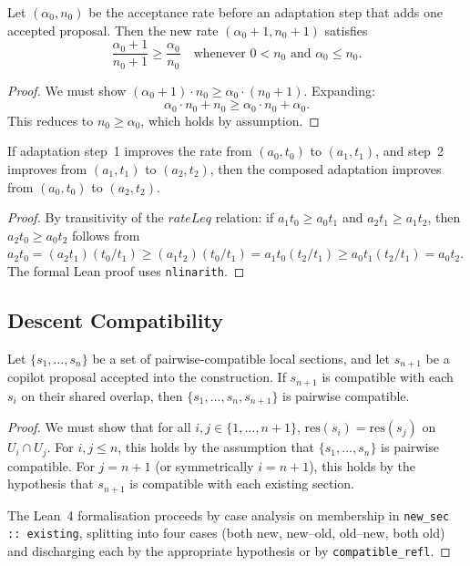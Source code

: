 \documentclass[11pt]{article}
\newcommand{\accrate}{\alpha}
\newcommand{\restrict}{\mathrm{res}}
\begin{document}
\begin{theorem}\label{thm:adapt-mono}
Let $(\accrate_0, n_0)$ be the acceptance rate before an adaptation
step that adds one accepted proposal.  Then the new rate
$(\accrate_0 + 1, n_0 + 1)$ satisfies
\[
  \frac{\accrate_0 + 1}{n_0 + 1} \geq \frac{\accrate_0}{n_0}
  \quad\text{whenever } 0 < n_0 \text{ and } \accrate_0 \leq n_0.
\]
\end{theorem}

\begin{proof}
We must show $(\accrate_0 + 1) \cdot n_0 \geq \accrate_0 \cdot
(n_0 + 1)$.  Expanding:
\[
  \accrate_0 \cdot n_0 + n_0
  \geq \accrate_0 \cdot n_0 + \accrate_0.
\]
This reduces to $n_0 \geq \accrate_0$, which holds by assumption.
\end{proof}

\begin{lemma}\label{lem:adapt-compose}
If adaptation step~1 improves the rate from $(a_0, t_0)$ to
$(a_1, t_1)$, and step~2 improves from $(a_1, t_1)$ to
$(a_2, t_2)$, then the composed adaptation improves from
$(a_0, t_0)$ to $(a_2, t_2)$.
\end{lemma}

\begin{proof}
By transitivity of the $\mathit{rateLeq}$ relation: if
$a_1 t_0 \geq a_0 t_1$ and $a_2 t_1 \geq a_1 t_2$, then
$a_2 t_0 \geq a_0 t_2$ follows from $a_2 t_0 = (a_2 t_1)(t_0/t_1)
\geq (a_1 t_2)(t_0/t_1) = a_1 t_0 (t_2/t_1) \geq a_0 t_1 (t_2/t_1)
= a_0 t_2$.  The formal Lean proof uses \texttt{nlinarith}.
\end{proof}

\subsection{Descent Compatibility}\label{sec:formal-descent}

\begin{theorem}\label{thm:descent}
Let $\{s_1, \ldots, s_n\}$ be a set of pairwise-compatible local
sections, and let $s_{n+1}$ be a copilot proposal accepted into the
construction.  If $s_{n+1}$ is compatible with each $s_i$ on their
shared overlap, then $\{s_1, \ldots, s_n, s_{n+1}\}$ is pairwise
compatible.
\end{theorem}

\begin{proof}
We must show that for all $i, j \in \{1, \ldots, n+1\}$,
$\restrict(s_i) = \restrict(s_j)$ on $U_i \cap U_j$.  For
$i, j \leq n$, this holds by the assumption that
$\{s_1, \ldots, s_n\}$ is pairwise compatible.  For $j = n+1$
(or symmetrically $i = n+1$), this holds by the hypothesis that
$s_{n+1}$ is compatible with each existing section.

The Lean~4 formalisation proceeds by case analysis on membership in
\texttt{new\_sec :: existing}, splitting into four cases (both new,
new--old, old--new, both old) and discharging each by the
appropriate hypothesis or by \texttt{compatible\_refl}.
\end{proof}
\end{document}
